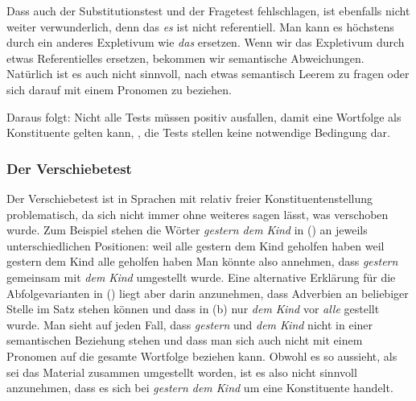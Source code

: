 %
Dass auch der Substitutionstest und der Fragetest fehlschlagen, ist ebenfalls
nicht weiter verwunderlich, denn das \emph{es} ist nicht referentiell.
Man kann es höchstens durch ein anderes Expletivum wie \emph{das} ersetzen.
Wenn wir das Expletivum durch etwas Referentielles ersetzen, bekommen wir semantische Abweichungen.
Natürlich ist es auch nicht sinnvoll, nach etwas semantisch Leerem zu fragen oder
sich darauf mit einem Pronomen zu beziehen.


Daraus folgt: Nicht alle Tests müssen positiv ausfallen, damit eine Wortfolge als Konstituente gelten kann,
\dash, die Tests stellen keine notwendige Bedingung dar.




\subsubsection{Der Verschiebetest}

Der Verschiebetest ist in Sprachen mit relativ freier Konstituentenstellung problematisch, da sich
nicht immer ohne weiteres sagen lässt, was verschoben wurde. Zum Beispiel stehen die Wörter
\emph{gestern dem Kind} in () an jeweils unterschiedlichen Positionen:
\eal
\ex weil alle gestern dem Kind geholfen haben
\ex weil gestern dem Kind alle geholfen haben
\zl
Man könnte also annehmen, dass \emph{gestern} gemeinsam mit \emph{dem Kind} umgestellt wurde. Eine
alternative Erklärung für die Abfolgevarianten in () liegt aber darin anzunehmen, dass
Adverbien an beliebiger Stelle im Satz stehen können und dass in (b) nur \emph{dem Kind} vor
\emph{alle} gestellt wurde. Man sieht auf jeden Fall, dass \emph{gestern} und \emph{dem Kind} nicht
in einer semantischen Beziehung stehen und dass man sich auch nicht mit einem Pronomen auf die
gesamte Wortfolge beziehen kann. Obwohl es so aussieht, als sei das Material zusammen umgestellt
worden, ist es also nicht sinnvoll anzunehmen, dass es sich bei \emph{gestern dem Kind} um eine
Konstituente handelt.

